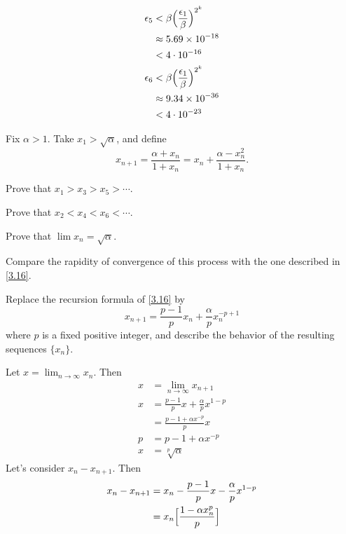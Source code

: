 \begin{exercise}
\begin{exercise}[label = (\alph*)]
    \begin{align*}
      \epsilon_5 & < \beta\Bigl(\frac{\epsilon_1}{\beta}\Bigr)^{2^k}\\
                 & \approx 5.69\times 10^{-18}\\
                 & < 4\cdot 10^{-16}\\
      \epsilon_6 & < \beta\Bigl(\frac{\epsilon_1}{\beta}\Bigr)^{2^k}\\
                 & \approx 9.34\times 10^{-36}\\
                 & < 4\cdot 10^{-23}
    \end{align*}
  \end{exercise}
\item
  Fix \(\alpha > 1\).
  Take \(x_1 > \sqrt{\alpha}\), and define
  \[
  x_{n + 1} = \frac{\alpha + x_n}{1 + x_n} = x_n +
  \frac{\alpha - x_n^2}{1 + x_n}.
  \]
  \begin{exercise}[label = (\alph*)]
  \item
    Prove that \(x_1 > x_3 > x_5 > \cdots\).
  \item
    Prove that \(x_2 < x_4 < x_6 < \cdots\).
  \item
    Prove that \(\lim x_n = \sqrt{\alpha}\).
  \item
    Compare the rapidity of convergence of this process with the one described
    in \cref{3.16}.
  \end{exercise}
\item
  Replace the recursion formula of \cref{3.16} by
  \[
  x_{n + 1} = \frac{p - 1}{p}x_n + \frac{\alpha}{p}x_n^{-p + 1}
  \]
  where \(p\) is a fixed positive integer, and describe the behavior of the
  resulting sequences \(\{x_n\}\).
  \par\smallskip
  Let \(x = \lim_{n\to\infty}x_n\).
  Then
  \begin{align*}
    x & = \lim_{n\to\infty}x_{n + 1}\\
    x & = \frac{p - 1}{p}x + \frac{\alpha}{p}x^{1 - p}\\
      & = \frac{p - 1 + \alpha x^{-p}}{p}x\\
    p & = p - 1 + \alpha x^{-p}\\
    x & = \sqrt[p]{\alpha}
  \end{align*}
  Let's consider \(x_n - x_{n + 1}\).
  Then
  \begin{align*}
    x_n - x_{n + 1} & = x_n - \frac{p - 1}{p}x - \frac{\alpha}{p}x^{1 - p}\\
                    & = x_n\Bigl[\frac{1 - \alpha x_n^p}{p}\Bigr]\\

\end{align*}
\end{exercise}
